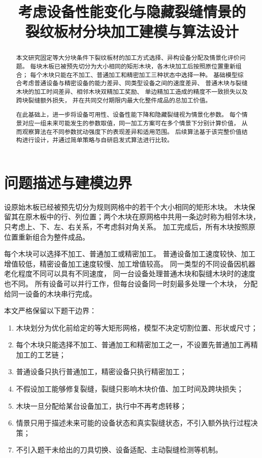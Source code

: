﻿\documentclass[UTF8,12pt,a4paper]{ctexart}
\title{\textbf{考虑设备性能变化与隐藏裂缝情景的\\
裂纹板材分块加工建模与算法设计}}
\author{}
\date{}
\begin{document}
\maketitle

\begin{abstract}
本文研究固定等大分块条件下裂纹板材的加工方式选择、异构设备分配及情景化评价问题。
每块木板已被预先切分为大小相同的矩形木块，各木块加工后按照原位置重新组合；
每个木块只能在不加工、普通加工和精密加工三种状态中选择一种。
基础模型综合考虑普通设备与精密设备的能力差异、同类型设备之间的速度差异、
普通木块与裂缝木块的加工时间差异、相邻木块双精加工奖励、
单边精加工造成的精度不一致损失以及跨块裂缝额外损失，
并在共同交付期限内最大化整件成品的总加工价值。

在此基础上，进一步将设备可用性、设备性能下降和隐藏裂缝视为情景化参数。
每个情景对应一组未来可能发生的参数取值，同一加工方案可在多个情景下分别计算价值，
从而观察算法在不同参数扰动强度下的表现差异和适用范围。
后续算法基于该完整价值结构进行设计，并通过简单策略与自研启发式算法进行比较。
\end{abstract}

\section{问题描述与建模边界}

设原始木板已经被预先切分为规则网格中的若干个大小相同的矩形木块。
木块保留其在原木板中的行、列位置；两个木块在原网格中共用一条边时称为相邻木块，
只考虑上、下、左、右关系，不考虑斜对角关系。
加工完成后，所有木块按照原位置重新组合为整件成品。

每个木块可以选择不加工、普通加工或精密加工。
普通设备加工速度较快、加工增值较低，精密设备加工速度较慢、加工增值较高。
同一类型的不同设备因机器老化程度不同可以具有不同速度，
同一台设备处理普通木块和裂缝木块时的速度也不同。
所有设备可以并行工作，但每台设备同一时刻最多处理一个木块，
分配给同一设备的木块串行完成。

本文严格保留以下题干边界：

\begin{enumerate}
  \item 木块划分为优化前给定的等大矩形网格，模型不决定切割位置、形状或尺寸；
  \item 每个木块只能选择不加工、普通加工和精密加工之一，不设置先普通加工再精加工的工艺链；
  \item 普通设备只执行普通加工，精密设备只执行精密加工；
  \item 不假设加工能够修复裂缝，裂缝只影响木块价值、加工时间及跨块损失；
  \item 木块一旦分配给某台设备加工，执行中不再考虑转移；
  \item 情景只用于描述未来可能的设备状态和真实裂缝状态，不引入额外执行过程决策；
  \item 不引入题干未给出的刀具切换、设备适配、主动裂缝检测等机制。
\end{enumerate}
\end{document}
